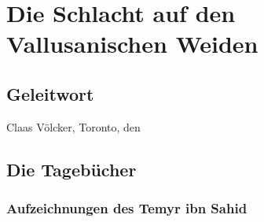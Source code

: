 \chapter{Die Schlacht auf den Vallusanischen Weiden}

\section{Geleitwort}

\begin{flushright}
Claas Völcker, Toronto, den 
\end{flushright}

\section{Die Tagebücher}

\subsection{Aufzeichnungen des Temyr ibn Sahid}

